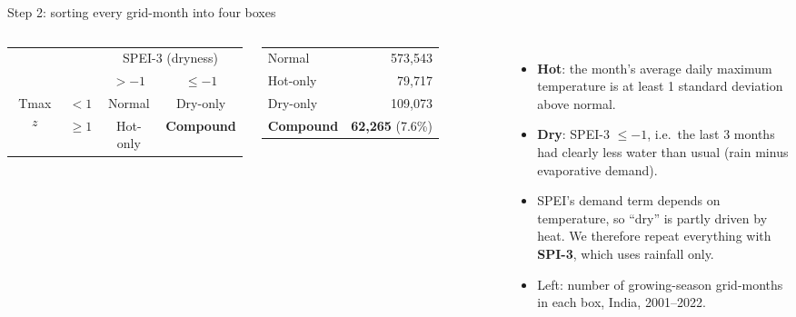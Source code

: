 \documentclass[11pt,aspectratio=169]{beamer}
\begin{document}
\begin{frame}{Step 2: sorting every grid-month into four boxes}
  \begin{columns}
    \centering
    \renewcommand{\arraystretch}{1.4}
    \begin{tabular}{cc|c|c}
      & & \multicolumn{2}{c}{SPEI-3 (dryness)} \\
      & & $> -1$ & $\le -1$ \\
      \hline
      \multirow{2}{*}{Tmax $z$} & $< 1$ & Normal & Dry-only \\
      & $\ge 1$ & Hot-only & \textbf{Compound} \\
    \end{tabular}

    \vspace{6pt}
    \scriptsize
    \begin{tabular}{@{}lr@{}}
      Normal & 573,543 \\
      Hot-only & 79,717 \\
      Dry-only & 109,073 \\
      \textbf{Compound} & \textbf{62,265} (7.6\%) \\
    \end{tabular}
    \scriptsize
    \begin{itemize}
      \item \textbf{Hot}: the month's average daily maximum temperature is at
        least 1 standard deviation above normal.
      \item \textbf{Dry}: SPEI-3 $\le -1$, i.e.\ the last 3 months had
        clearly less water than usual (rain minus evaporative demand).
      \item SPEI's demand term depends on temperature, so ``dry'' is partly
        driven by heat. We therefore repeat everything with
        \textbf{SPI-3}, which uses rainfall only.
      \item Left: number of growing-season grid-months in each box, India,
        2001--2022.
    \end{itemize}
  \end{columns}
\end{frame}
\end{document}

